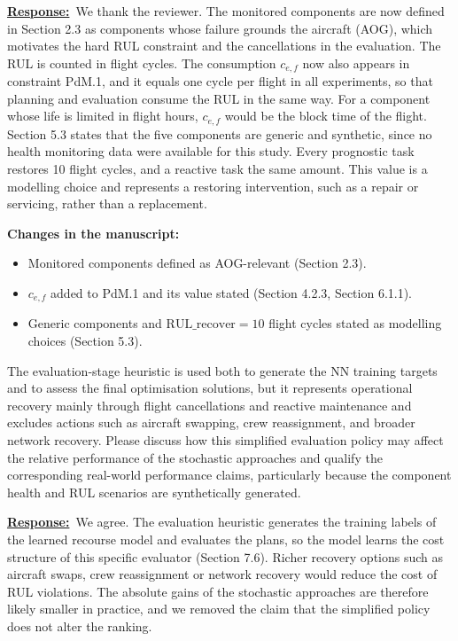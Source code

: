 \documentclass{article}
\newcommand{\response}{\vspace{0.1cm}\noindent\underline{\textbf{Response:}}\ }
\newcommand{\changes}{\vspace{0.1cm}\noindent\textbf{Changes in the manuscript:}}
\begin{document}
\response We thank the reviewer. The monitored components are now defined in Section 2.3 as components whose failure grounds the aircraft (AOG), which motivates the hard RUL constraint and the cancellations in the evaluation. The RUL is counted in flight cycles. The consumption $c_{e,f}$ now also appears in constraint PdM.1, and it equals one cycle per flight in all experiments, so that planning and evaluation consume the RUL in the same way. For a component whose life is limited in flight hours, $c_{e,f}$ would be the block time of the flight. Section 5.3 states that the five components are generic and synthetic, since no health monitoring data were available for this study. Every prognostic task restores 10 flight cycles, and a reactive task the same amount. This value is a modelling choice and represents a restoring intervention, such as a repair or servicing, rather than a replacement.

\changes
\begin{itemize}[nosep]
\item Monitored components defined as AOG-relevant (Section 2.3).
\item $c_{e,f}$ added to PdM.1 and its value stated (Section 4.2.3, Section 6.1.1).
\item Generic components and $\mathrm{RUL\_recover} = 10$ flight cycles stated as modelling choices (Section 5.3).
\end{itemize}

\begin{cmt}{}{}
The evaluation-stage heuristic is used both to generate the NN training targets and to assess the final optimisation solutions, but it represents operational recovery mainly through flight cancellations and reactive maintenance and excludes actions such as aircraft swapping, crew reassignment, and broader network recovery. Please discuss how this simplified evaluation policy may affect the relative performance of the stochastic approaches and qualify the corresponding real-world performance claims, particularly because the component health and RUL scenarios are synthetically generated.
\end{cmt}

\response We agree. The evaluation heuristic generates the training labels of the learned recourse model and evaluates the plans, so the model learns the cost structure of this specific evaluator (Section 7.6). Richer recovery options such as aircraft swaps, crew reassignment or network recovery would reduce the cost of RUL violations. The absolute gains of the stochastic approaches are therefore likely smaller in practice, and we removed the claim that the simplified policy does not alter the ranking.
\end{document}
